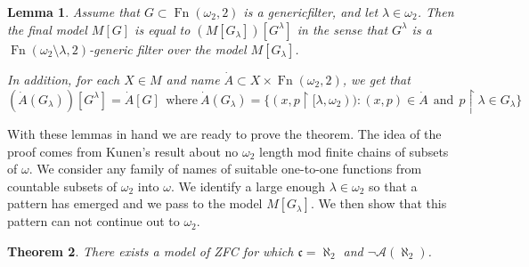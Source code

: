 \documentclass{rmmcart}
\theoremstyle{plain}
\newtheorem{theorem}{Theorem}
\newtheorem{lemma}[theorem]{Lemma}
\theoremstyle{definition}
\theoremstyle{remark}
\theoremstyle{plain}
\theoremstyle{definition}
\theoremstyle{remark}
\begin{document}
            \begin{lemma}\cite{MR597342}
            Assume that $G\subset \operatorname{Fn}(\omega_2,2)$ is a
             generic\label{factor} filter,
             and let $\lambda\in \omega_2$. Then the final model $M[G]$
            is equal to $(M[G_\lambda])[G^\lambda]$ in the sense that
            $G^\lambda$ is a $\operatorname{Fn}(\omega_2\setminus \lambda,
             2)$-generic filter   over the model $M[G_\lambda]$.

            In addition, for each $X\in M$ and name $\dot A\subset
            X\times \operatorname{Fn}(\omega_2,2)$, we get that
             \[ (\dot A(G_\lambda))[G^\lambda] = \dot A [G]\ \ \mbox{where}\
            \dot A(G_\lambda) =
             \{ (x,p\restriction [\lambda,\omega_2))  :
             (x,p)\in \dot A\ \ \mbox{and} \ \ p\restriction \lambda\in G_\lambda\}
            \]
            \end{lemma}


            With these lemmas in hand we are ready to prove the theorem. The idea
            of the proof comes from  Kunen's result about no $\omega_2$ length mod
            finite chains of subsets of $\omega$. We consider any  family of
            names  of suitable one-to-one functions from countable subsets of
            $\omega_2$ into $\omega$. We identify a large enough $\lambda\in \omega_2$
            so that a pattern has emerged and we pass to the model $M[G_\lambda]$. We
            then show that this pattern can not continue out to $\omega_2$.

            \begin{theorem} There exists a model of ZFC for which
             $\mathfrak c=\aleph_2$ and $\lnot \mathcal A(\aleph_2)$.
            \end{theorem}
\end{document}

